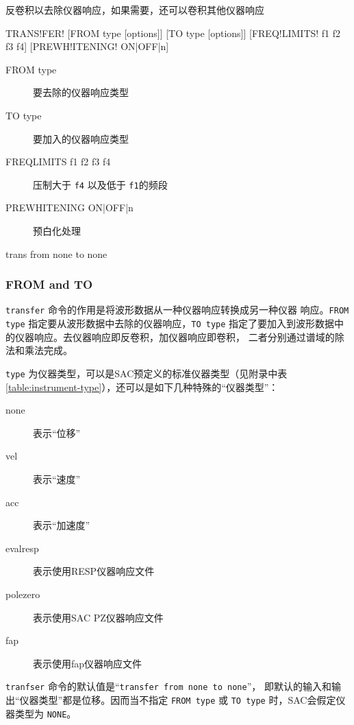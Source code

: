 \label{cmd:transfer}

反卷积以去除仪器响应，如果需要，还可以卷积其他仪器响应

\begin{SACSTX}
TRANS!FER! [FROM type [options]] [TO type [options]] [FREQ!LIMITS! f1 f2 f3 f4]
    [PREWH!ITENING! ON|OFF|n]
\end{SACSTX}

\begin{description}
\item [FROM type] 要去除的仪器响应类型
\item [TO type] 要加入的仪器响应类型
\item [FREQLIMITS f1 f2 f3 f4] 压制大于 \texttt{f4} 以及低于 \texttt{f1}的频段
\item [PREWHITENING ON|OFF|n] 预白化处理
\end{description}

\begin{SACDFT}
trans from none to none
\end{SACDFT}

\subsubsection{FROM and TO}
\texttt{transfer} 命令的作用是将波形数据从一种仪器响应转换成另一种仪器
响应。\texttt{FROM type} 指定要从波形数据中去除的仪器响应，\texttt{TO type}
指定了要加入到波形数据中的仪器响应。去仪器响应即反卷积，加仪器响应即卷积，
二者分别通过谱域的除法和乘法完成。

\texttt{type} 为仪器类型，可以是SAC预定义的标准仪器类型（见附录中表
\ref{table:instrument-type}），还可以是如下几种特殊的``仪器类型''：
\begin{description}
\item [none] 表示``位移''
\item [vel] 表示``速度''
\item [acc] 表示``加速度''
\item [evalresp] 表示使用RESP仪器响应文件
\item [polezero] 表示使用SAC PZ仪器响应文件
\item [fap] 表示使用fap仪器响应文件
\end{description}

\texttt{tranfser} 命令的默认值是``\texttt{transfer from none to none}''，
即默认的输入和输出``仪器类型''都是位移。因而当不指定 \texttt{FROM type}
或 \texttt{TO type} 时，SAC会假定仪器类型为 \texttt{NONE}。

